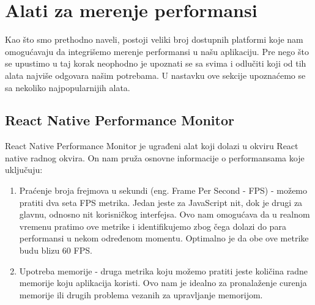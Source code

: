 \documentclass[12pt,oneside]{memoir}
\begin{document}
\section{Alati za merenje performansi}

Kao što smo prethodno naveli, postoji veliki broj dostupnih platformi koje nam omogućavaju da integrišemo merenje performansi u našu aplikaciju. Pre nego što se upustimo u taj korak neophodno je upoznati se sa svima i odlučiti koji od tih alata najviše odgovara našim potrebama. U nastavku ove sekcije upoznaćemo se sa nekoliko najpopularnijih alata.

\subsection{React Native Performance Monitor}

React Native Performance Monitor je ugrađeni alat koji dolazi u okviru React native radnog okvira. On nam pruža osnovne informacije o performansama koje uključuju:

\begin{enumerate}
    \item Praćenje broja frejmova u sekundi (eng. Frame Per Second - FPS) - možemo pratiti dva seta FPS metrika. Jedan jeste za JavaScript nit, dok je drugi za glavnu, odnosno nit korisničkog interfejsa. Ovo nam omogućava da u realnom vremenu pratimo ove metrike i identifikujemo zbog čega dolazi do para performansi u nekom određenom momentu. Optimalno je da obe ove metrike budu blizu 60 FPS.
    \item Upotreba memorije - druga metrika koju možemo pratiti jeste količina radne memorije koju aplikacija koristi. Ovo nam je idealno za pronalaženje curenja memorije ili drugih problema vezanih za upravljanje memorijom.
\end{enumerate}
\end{document}
